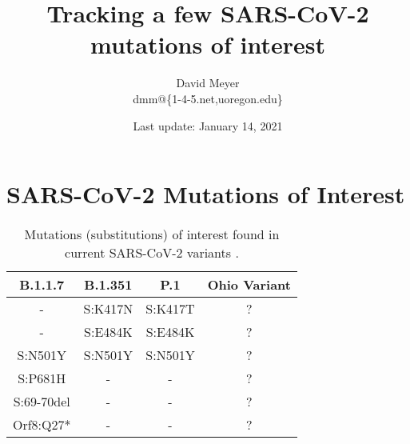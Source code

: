 \documentclass[11pt, oneside]{article}   	%
\title{Tracking a few SARS-CoV-2 mutations of interest}
\author{David Meyer \\ dmm@\{1-4-5.net,uoregon.edu\}}
\date{Last update: January 14, 2021}							%
\begin{document}
\maketitle

\section*{SARS-CoV-2 Mutations of Interest}

\begin{table} [H]
  \begin{center}
    \begin{tabular}{c|c|c|c} 
      \textbf{B.1.1.7} & \textbf{B.1.351} & \textbf{P.1} & \textbf{Ohio Variant} \\
      \hline 
      \hline 
      - & S:K417N & S:K417T & ? \\
      - & S:E484K & S:E484K & ? \\
      S:N501Y & S:N501Y & S:N501Y & ? \\
      S:P681H & - & - & ? \\
      S:69-70del & - &- & ? \\
      Orf8:Q27* & - & - & ? \\
    \end{tabular}
  \end{center}
 \caption{Mutations (substitutions) of interest found in current SARS-CoV-2 variants  \cite{covid:nextstrain,covid:lineages}.}
\end{table}



\end{document}
